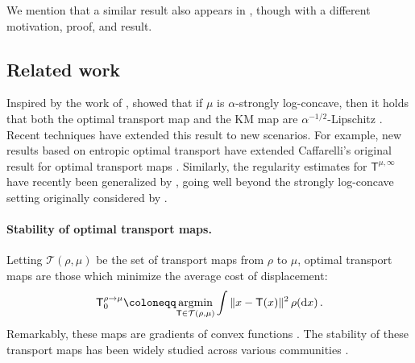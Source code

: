 \documentclass[12pt]{article}
\newcommand{\cT}{\mathcal{T}}
\newcommand{\1}{\mathds{1}}
\newcommand*{\defeq}{\coloneqq}
\newcommand*{\rd}{\mathrm{d}}
\newcommand*{\dd}{\, \rd}
\theoremstyle{plain}
\theoremstyle{definition}
\theoremstyle{remark}
\begin{document}
We mention that a similar result also appears in \cite{khudiakova2025optimal}, though with a different motivation, proof, and result.

\subsection{Related work}\label{sec:related}
Inspired by the work of \cite{caffarelli2000monotonicity}, \cite{kim2012generalization} showed that if $\mu$ is $\alpha$-strongly log-concave, then it holds that both the optimal transport map and the KM map are $\alpha^{-1/2}$-Lipschitz \citep{caffarelli2000monotonicity,kim2012generalization}. Recent techniques have extended this result to new scenarios. For example, new results based on entropic optimal transport have extended Caffarelli's original result for optimal transport maps \citep{FatGozPro20Caff, chewi2023entropic,gozlan2025global}. Similarly, the regularity estimates for $\mathsf T^{\mu,\infty}$ have recently been generalized by \cite{MikShe23HeatFlow,BriPed25HeatFlow,chaintron_propagation_2025}, going well beyond the strongly log-concave setting originally considered by \cite{kim2012generalization}.

\paragraph{Stability of optimal transport maps.}
Letting $\cT(\rho,\mu)$ be the set of transport maps from $\rho$ to $\mu$, optimal transport maps are those which minimize the average cost of displacement:
\begin{align}
    \mathsf  T_{0}^{\rho\to\mu} \defeq \underset{\mathsf  T \in \cT(\rho,\mu)}{\rm argmin}\int \|x- \mathsf T(x)\|^2 \, \rho(\!\dd x)\,.
\end{align}
Remarkably, these maps are gradients of convex functions \citep{brenier1991polar}. The stability of these transport maps has been widely studied across various communities \citep{gigli2011holder,delalande2023quantitative, balakrishnan2025stability, letrouit2025quantitative,cazelles2026statistical, merigot2026sharp}.
\end{document}
